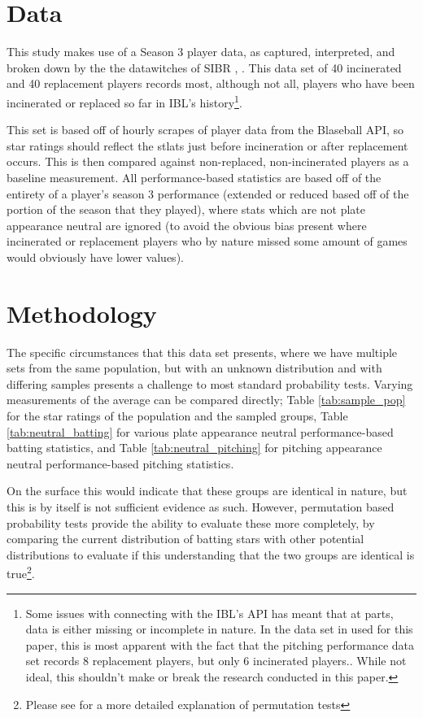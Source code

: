 \documentclass[9pt,twocolumn,twoside,a4]{sibrjnl}
\begin{document}
\section{Data}
This study makes use of a Season 3 player data, as captured, interpreted, and broken down by the the datawitches of SIBR \citep{BlaseballS3Stlats}, \citep{BlaseballS3Performance}. This data set of 40 incinerated and 40 replacement players records most, although not all, players who have been incinerated or replaced so far in {\small{IBL}}’s history\footnote{Some issues with connecting with the IBL’s API has meant that at parts, data is either missing or incomplete in nature. In the data set in used for this paper, this is most apparent with the fact that the pitching performance data set records 8 replacement players, but only 6 incinerated players.\citep{BlaseballS3Performance}. While not ideal, this shouldn't make or break the research conducted in this paper.}. 

This set is based off of hourly scrapes of player data from the Blaseball API, so star ratings should reflect the stlats just before incineration or after replacement occurs. This is then compared against non-replaced, non-incinerated players as a baseline measurement. All performance-based statistics are based off of the entirety of a player’s season 3 performance (extended or reduced based off of the portion of the season that they played), where stats which are not plate appearance neutral are ignored (to avoid the obvious bias present where incinerated or replacement players who by nature missed some amount of games would obviously have lower values).

\section{Methodology}
The specific circumstances that this data set presents, where we have multiple sets from the same population, but with an unknown distribution and with differing samples presents a challenge to most standard probability tests. Varying measurements of the average can be compared directly; Table \ref{tab:sample_pop} for the star ratings of the population and the sampled groups, Table \ref{tab:neutral_batting} for various plate appearance neutral performance-based batting statistics, and Table \ref{tab:neutral_pitching} for pitching appearance neutral performance-based pitching statistics. 

On the surface this would indicate that these groups are identical in nature, but this  is by itself is not sufficient evidence as such. However, permutation based probability tests provide the ability to evaluate these more completely, by comparing the current distribution of batting stars with other potential distributions to evaluate if this understanding that the two groups are identical is true\footnote{ Please see \citep{Wilber2019} for a more detailed explanation of permutation tests}.
\end{document}
